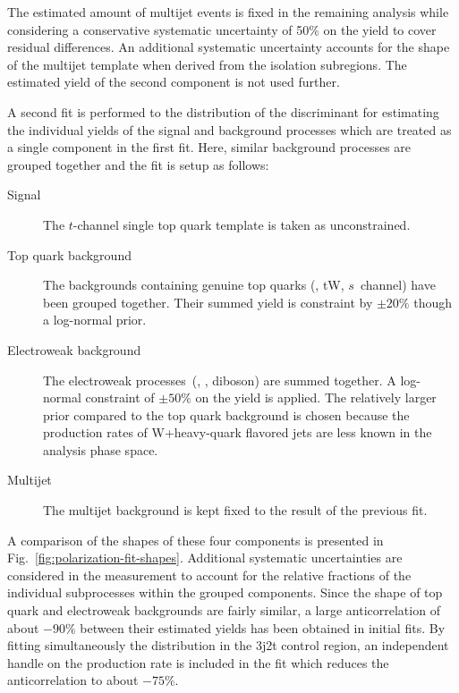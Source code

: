 The estimated amount of multijet events is fixed in the remaining analysis while considering a conservative systematic uncertainty of 50\% on the yield to cover residual differences. An additional systematic uncertainty accounts for the shape of the multijet template when derived from the isolation subregions. The estimated yield of the second component is not used further. 

A second fit is performed to the distribution of the \bdttch discriminant for estimating the individual yields of the signal and background processes which are treated as a single component in the first fit. Here, similar background processes are grouped together and the fit is setup as follows:

\begin{description}
\item[Signal] The $t$-channel single top quark template is taken as unconstrained.
\item[Top quark background] The backgrounds containing genuine top quarks (\ttbar, tW, $s$~channel) have been grouped together. Their summed yield is constraint by $\pm20\%$ though a log-normal prior.
\item[Electroweak background] The electroweak processes~(\wjets, \zjets, diboson) are summed together. A log-normal constraint of $\pm50\%$ on the yield is applied. The relatively larger prior compared to the top quark background is chosen because the production rates of W+heavy-quark flavored jets are less known in the analysis phase space.
\item[Multijet] The multijet background is kept fixed to the result of the previous fit.
\end{description}

A comparison of the shapes of these four components is presented in Fig.~\ref{fig:polarization-fit-shapes}. Additional systematic uncertainties are considered in the measurement to account for the relative fractions of the individual subprocesses within the grouped components. Since the \bdttch shape of top quark and  electroweak backgrounds are fairly similar, a large anticorrelation of about $-90\%$ between their estimated yields has been obtained in initial fits. By fitting simultaneously the \bdttch distribution in the 3j2t control region, an independent handle on the \ttbar production rate is included in the fit which reduces the anticorrelation to about $-75\%$.


